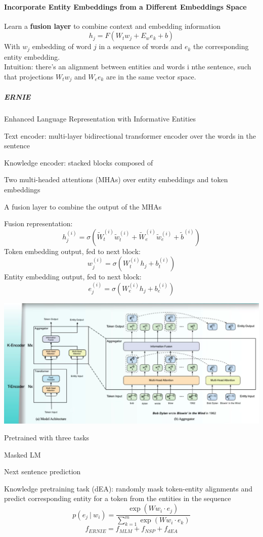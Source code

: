 \documentclass[10pt]{report}
\begin{document}
\paragraph{Incorporate Entity Embeddings from a Different Embeddings Space} Learn a \textbf{fusion layer} to combine context and embedding information
$$h_j  = F(W_tw_j + E_we_k + b)$$
With $w_j$ embedding of word $j$ in a sequence of words and $e_k$ the corresponding entity embedding.\\
Intuition: there's an alignment between entities and words i nthe sentence, such that projections $W_tw_j$ and $W_ee_k$ are in the same vector space.
\subparagraph{ERNIE} Enhanced Language Representation with Informative Entities
\begin{list}{}{}
	\item Text encoder: multi-layer bidirectional transformer encoder over the words in the sentence
	\item Knowledge encoder: stacked blocks composed of
	\begin{list}{}{}
		\item Two multi-headed attentions (MHAs) over entity embeddings and token embeddings
		\item A fusion layer to combine the output of the MHAs
	\end{list}
\end{list}
Fusion representation:
$$ h_j^{(i)} = \sigma(\tilde{W}_t^{(i)}\tilde{w}_t^{(i)} + \tilde{W}_e^{(i)}\tilde{w}_e^{(i)}+\tilde{b}^{(i)})$$
Token embedding output, fed to next block:
$$w_j^{(i)} = \sigma(W_t^{(i)}h_j+b_t^{(i)})$$
Entity embedding output, fed to next block:
$$e_j^{(i)} = \sigma(W_e^{(i)}h_j + b_e^{(i)}) $$
\begin{center}
	\includegraphics[scale=0.5]{109.png}
\end{center}
\pagebreak
Pretrained with three tasks
\begin{list}{}{}
	\item Masked LM 
	\item Next sentence prediction
	\item Knowledge pretraining task (dEA): randomly mask token-entity alignments and predict corresponding entity for a token from the entities in the sequence
	$$p(e_j\:|\:w_i) = \frac{\exp(Ww_i\cdot e_j)}{\sum_{k=1}^m \exp(Ww_i\cdot e_k)}$$
	$$f_{ERNIE} = f_{MLM} + f_{NSP} + f_{dEA}$$
\end{list}
\end{document}
